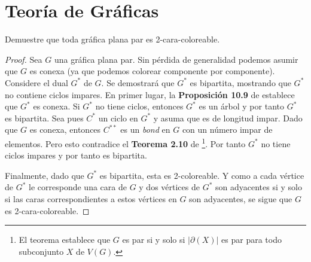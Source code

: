 \documentclass[12pt]{article}
\newenvironment{problem}[2][Problema]{\begin{trivlist}
\item[\hskip \labelsep {\bfseries #1}\hskip \labelsep {\bfseries #2.}]}{\end{trivlist}}
\begin{document}
\section*{Teoría de Gráficas}


\begin{problem}{11.2.2} Demuestre que toda gráfica plana par es 2-cara-coloreable.
\end{problem}
\begin{proof}
Sea $G$ una gráfica plana par. Sin pérdida de generalidad podemos asumir que $G$ es conexa (ya que podemos colorear componente por componente). Considere el dual $G^\ast$ de $G$. Se demostrará que $G^\ast$ es bipartita, mostrando que $G^\ast$ no contiene ciclos impares. En primer lugar, la \textbf{Proposición 10.9} de \cite{10.5555/1481153} establece que $G^\ast$ es conexa. Si $G^\ast$ no tiene ciclos, entonces $G^\ast$ es un árbol y por tanto $G^\ast$ es bipartita. Sea pues $C^\ast$ un ciclo en $G^\ast$ y asuma que es de longitud impar. Dado que $G$ es conexa, entonces $C^{\ast \ast}$ es un \textit{bond} en $G$ con un número impar de elementos. Pero esto contradice el \textbf{Teorema 2.10} de \cite{10.5555/1481153} \footnote{El teorema establece que $G$ es par si y solo si $\lvert \partial(X) \rvert$ es par para todo subconjunto $X$ de $V(G).$}. Por tanto $G^\ast$ no tiene ciclos impares y por tanto es bipartita.

Finalmente, dado que $G^\ast$ es bipartita, esta es 2-coloreable. Y como a cada vértice de $G^\ast$ le corresponde una cara de $G$ y dos vértices de $G^\ast$ son adyacentes si y solo si las caras correspondientes a estos vértices en $G$ son adyacentes, se sigue que $G$ es 2-cara-coloreable.
\end{proof}
\end{document}
